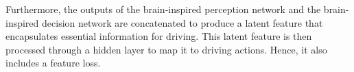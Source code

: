 Furthermore, the outputs of the brain-inspired perception network and the brain-inspired decision network are concatenated to produce a latent feature that encapsulates essential information for driving. This latent feature is then processed through a hidden layer to map it to driving actions. Hence, it also includes a feature loss.

